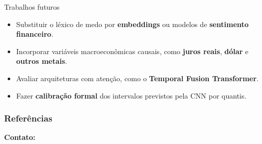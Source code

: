 \documentclass{libs/ufc_format}
\begin{document}
\begin{frame}{Trabalhos futuros}
    \begin{itemize}
        \item Substituir o léxico de medo por \textbf{embeddings} ou modelos de \textbf{sentimento financeiro}.
        \item Incorporar variáveis macroeconômicas causais, como \textbf{juros reais}, \textbf{dólar} e \textbf{outros metais}.
        \item Avaliar arquiteturas com atenção, como o \textbf{Temporal Fusion Transformer}.
        \item Fazer \textbf{calibração formal} dos intervalos previstos pela CNN por quantis.
    \end{itemize}

    \vspace{0.3cm}
\end{frame}

\begin{frame}[allowframebreaks]
    \frametitle{Referências}
    \printbibliography
\end{frame}

\begin{frame}{}
    \centering
    \huge{\textbf{}}
    
    \vspace{1cm}
    
    \Large{\textbf{Contato:}}
    \newline
    \vspace*{0.5cm}
    \large{}
\end{frame}
\end{document}

